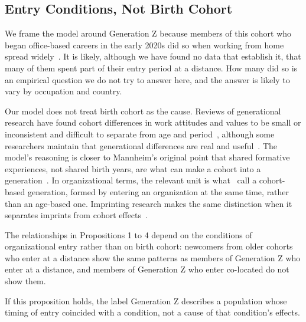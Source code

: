 \subsection{Entry Conditions, Not Birth Cohort}

We frame the model around Generation Z because members of this cohort who began office-based careers in the early 2020s did so when working from home spread widely~\citep{kniffin2021covid}. It is likely, although we have found no data that establish it, that many of them spent part of their entry period at a distance. How many did so is an empirical question we do not try to answer here, and the answer is likely to vary by occupation and country.

Our model does not treat birth cohort as the cause. Reviews of generational research have found cohort differences in work attitudes and values to be small or inconsistent and difficult to separate from age and period~\citep{costanza2012generational,parry2011generational,rudolph2021generations}, although some researchers maintain that generational differences are real and useful~\citep{campbell2015generational}. The model's reasoning is closer to Mannheim's original point that shared formative experiences, not shared birth years, are what can make a cohort into a generation~\citep{mannheim1952problem}. In organizational terms, the relevant unit is what~\citet{joshi2010unpacking} call a cohort-based generation, formed by entering an organization at the same time, rather than an age-based one. Imprinting research makes the same distinction when it separates imprints from cohort effects~\citep{marquis2013imprinting}.

\begin{proposition}
The relationships in Propositions 1 to 4 depend on the conditions of organizational entry rather than on birth cohort: newcomers from older cohorts who enter at a distance show the same patterns as members of Generation Z who enter at a distance, and members of Generation Z who enter co-located do not show them.
\end{proposition}

If this proposition holds, the label Generation Z describes a population whose timing of entry coincided with a condition, not a cause of that condition's effects.
